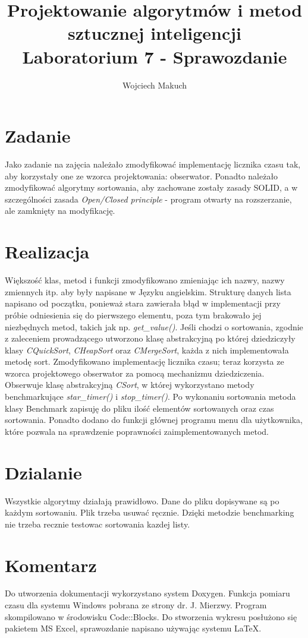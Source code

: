\documentclass[twoside]{article}
\newcommand{\+}{\discretionary{\mbox{\scriptsize$\hookleftarrow$}}{}{}}
\begin{document}
\title{Projektowanie algorytmów i metod sztucznej inteligencji\\Laboratorium 7 - Sprawozdanie}
\author{Wojciech Makuch}
\date{}

	\maketitle
	\section{Zadanie}\label{sec:Zadanie}
	Jako zadanie na zajęcia należało zmodyfikować implementację licznika czasu tak,  aby korzystały one ze wzorca projektowania: obserwator. Ponadto należało zmodyfikować algorytmy sortowania, aby zachowane zostały zasady SOLID, a w szczególności zasada  \textsl{Open/Closed principle} - program otwarty na rozszerzanie, ale zamknięty na modyfikację.
	
	\section{Realizacja}\label{sec:Realizacja}
	Większość klas, metod i funkcji zmodyfikowano zmieniając ich nazwy, nazwy zmiennych itp. aby były napisane w Języku angielskim. Strukturę danych lista napisano od początku, ponieważ stara zawierała błąd w implementacji przy próbie odniesienia się do pierwszego elementu, poza tym brakowało jej niezbędnych metod, takich jak np. \textsl{get\_value()}.  Jeśli chodzi o sortowania, zgodnie z zaleceniem prowadzącego utworzono klasę abstrakcyjną po której dziedziczyły klasy \textsl{CQuickSort}, \textsl{CHeapSort} oraz \textsl{CMergeSort}, każda z nich implementowała metodę sort.  Zmodyfikowano implementację licznika czasu; teraz korzysta ze wzorca projektowego obserwator za pomocą mechanizmu dziedziczenia. Obserwuje klasę abstrakcyjną \textsl{CSort}, w której wykorzystano metody benchmarkujące \textsl{star\_timer()} i \textsl{stop\_timer()}.  Po wykonaniu sortowania  metoda klasy Benchmark zapisuję do pliku ilość elementów sortowanych oraz czas sortowania. Ponadto dodano do funkcji głównej programu menu dla użytkownika, które pozwala na sprawdzenie poprawności zaimplementowanych metod.   
	
	\section{Dzialanie}\label{sec:Dzialanie}
	Wszystkie algorytmy działają prawidłowo. Dane do pliku dopisywane są po każdym sortowaniu. Plik trzeba usuwać ręcznie. Dzięki metodzie benchmarking nie trzeba recznie testowac sortowania kazdej listy.
	
	\section{Komentarz}\label{sec:Komentarz}
	Do utworzenia dokumentacji wykorzystano system Doxygen. Funkcja pomiaru czasu dla systemu Windows pobrana ze strony dr. J. Mierzwy. Program skompilowano w środowisku Code::Blocks. Do stworzenia wykresu posłużono się pakietem MS Excel, sprawozdanie napisano używając systemu \LaTeX.
\end{document}
